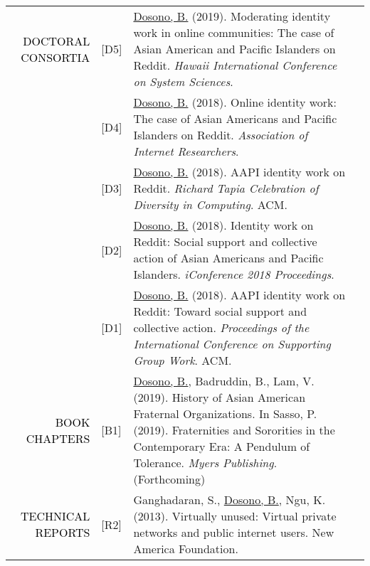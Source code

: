 \documentclass[12pt]{article}
\begin{document}
{{\begin{longtable}{Rp{1.0in}p{0.25in}p{4.75in}}
\textcolor{black}{\footnotesize{\uppercase{Doctoral Consortia}}} & \footnotesize{[D5]} & 
 \href{http://hicss.hawaii.edu/doctoral-consortium/}{{Dosono, B.}} (2019). Moderating identity work in online communities: The case of Asian American and Pacific Islanders on Reddit. \textit{Hawaii International Conference on System Sciences}. \\

& \footnotesize{[D4]} & \href{https://aoir.org/}{{Dosono, B.}} (2018). Online identity work: The case of Asian Americans and Pacific Islanders on Reddit. \textit{Association of Internet Researchers}. \\

& \footnotesize{[D3]} & \href{http://tapiaconference.org/schedule/wednesday-september-19-2018/100pm-500pm/doctoral-consortium/aapi-identity-work-on-reddit-toward-social-support-and-collective-action/}{{Dosono, B.}} (2018). AAPI identity work on Reddit. \textit{Richard Tapia Celebration of Diversity in Computing}. ACM. \\

& \footnotesize{[D2]} & \href{http://ischools.org/the-iconference/program/doctoral-colloquium/2018-doctoral-colloquium/}{{Dosono, B.}} (2018). Identity work on Reddit: Social support and collective action of Asian Americans and Pacific Islanders. \textit{iConference 2018 Proceedings}. \\

& \footnotesize{[D1]} & \href{https://dl.acm.org/authorize?N42808}{{Dosono, B.}} (2018). AAPI identity work on Reddit: Toward social support and collective action. \textit{Proceedings of the International Conference on Supporting Group Work}. ACM. \\

\textcolor{black}{\footnotesize{\uppercase{Book Chapters}}} & \footnotesize{[B1]} & \href{http://myersedpress.com/BookDetail.aspx?productID=536594}{{Dosono, B.}}, Badruddin, B., Lam, V. (2019). History of Asian American Fraternal Organizations. In Sasso, P. (2019). Fraternities and Sororities in the Contemporary Era: A Pendulum of Tolerance. \textit{Myers Publishing}. (Forthcoming) \\

\textcolor{black}{\footnotesize{\uppercase{Technical Reports}}} & \footnotesize{[R2]} & Ganghadaran, S., \href{http://newamerica.net/publications/policy/virtually_unused}{{Dosono, B.}}, Ngu, K. (2013). Virtually unused: Virtual private networks and public internet users. New America Foundation. \\


\end{longtable}}}
\end{document}
